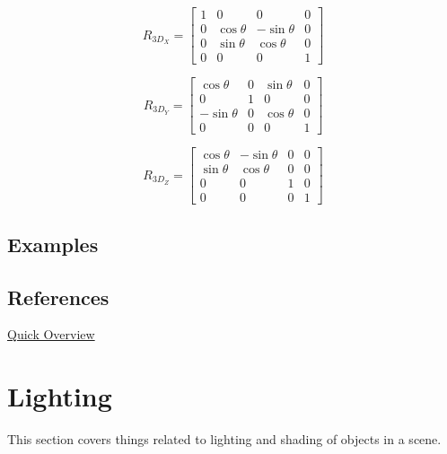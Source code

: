 \begin{equation}
\label{eqn:crossprodLine}
R_{3D_X} = \begin{bmatrix}
1 & 0 & 0 & 0\\ 
0 & \cos{\theta} & -\sin{\theta} & 0\\ 
0 & \sin{\theta} & \cos{\theta} & 0\\
0 & 0 & 0 & 1 
\end{bmatrix}
\end{equation}

\begin{equation}
\label{eqn:crossprodLine}
R_{3D_Y} = \begin{bmatrix}
\cos{\theta} & 0 & \sin{\theta} & 0\\ 
0 & 1 & 0 & 0\\ 
-\sin{\theta} & 0 & \cos{\theta} & 0\\
0 & 0 & 0 & 1 
\end{bmatrix}
\end{equation}

\begin{equation}
\label{eqn:crossprodLine}
R_{3D_Z} = \begin{bmatrix}
\cos{\theta} & -\sin{\theta} & 0 & 0\\ 
\sin{\theta} & \cos{\theta} & 0 & 0\\ 
0 & 0 & 1 & 0\\
0 & 0 & 0 & 1
\end{bmatrix}
\end{equation}
\subsection{Examples}

\subsection{References}
\href{http://math.hws.edu/graphicsbook/c2/s3.html}{Quick Overview}

\newpage
\section{Lighting}
This section covers things related to lighting and shading of objects in a scene.

